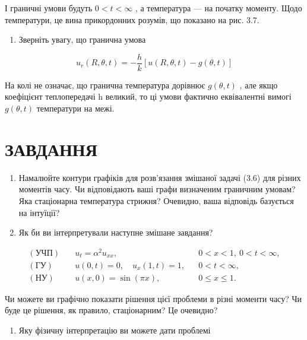 \documentclass[
  ukrainian,
]{article}
\providecommand{\tightlist}{%
  \setlength{\itemsep}{0pt}\setlength{\parskip}{0pt}}
\begin{document}
І граничні умови будуть \(0 < t < \infty\) , а температура --- на
початку моменту. Щодо температури, це вина прикордонних розумів, що
показано на рис. 3.7.

\begin{enumerate}
\def\labelenumi{\arabic{enumi}.}
\setcounter{enumi}{1}
\tightlist
\item
  Зверніть увагу, що гранична умова
\end{enumerate}

\[
u_r(R, \theta, t) = -\frac{h}{k} [u(R, \theta, t) - g(\theta, t)]
\]

На колі не означає, що гранична температура дорівнює \(g(\theta,t)\) ,
але якщо коефіцієнт теплопередачі h великий, то ці умови фактично
еквівалентні вимогі \(g(\theta,t)\) температури на межі.

\section{ЗАВДАННЯ}\label{ux437ux430ux432ux434ux430ux43dux43dux44f-2}

\begin{enumerate}
\def\labelenumi{\arabic{enumi}.}
\item
  Намалюйте контури графіків для розв'язання змішаної задачі (3.6) для
  різних моментів часу. Чи відповідають ваші графи визначеним граничним
  умовам? Яка стаціонарна температура стрижня? Очевидно, ваша відповідь
  базується на інтуїції?
\item
  Як би ви інтерпретували наступне змішане завдання?
\end{enumerate}

\[
\begin{aligned}
(\text{УЧП})\quad & u_t = \alpha^2 u_{xx}, && 0 < x < 1,\ 0 < t < \infty, \\
(\text{ГУ})\quad & u(0,t) = 0,\quad u_x(1,t) = 1, && 0 < t < \infty, \\
(\text{НУ})\quad & u(x,0) = \sin(\pi x), && 0 \leqslant x \leqslant 1.
\end{aligned}
\]

Чи можете ви графічно показати рішення цієї проблеми в різні моменти
часу? Чи буде це рішення, як правило, стаціонарним? Це очевидно?

\begin{enumerate}
\def\labelenumi{\arabic{enumi}.}
\setcounter{enumi}{2}
\tightlist
\item
  Яку фізичну інтерпретацію ви можете дати проблемі
\end{enumerate}
\end{document}
